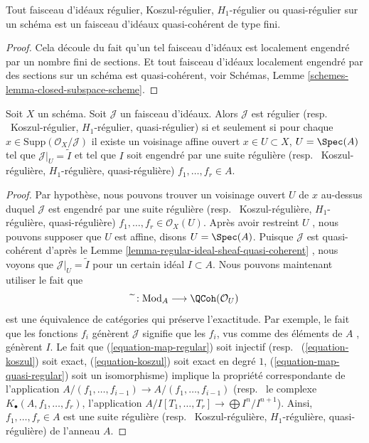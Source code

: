 \begin{lemma}
\label{lemma-regular-ideal-sheaf-quasi-coherent}
Tout faisceau d'idéaux régulier, Koszul-régulier,  $H_1$-régulier ou
quasi-régulier sur un schéma est un faisceau d'idéaux quasi-cohérent de type fini.
\end{lemma}

\begin{proof}
Cela découle du fait qu'un tel faisceau d'idéaux est localement engendré par un
nombre fini de sections. Et tout faisceau d'idéaux localement engendré par des
sections sur un schéma est quasi-cohérent, voir Schémas, Lemme  \ref{schemes-lemma-closed-subspace-scheme}.
\end{proof}

\begin{lemma}
\label{lemma-regular-ideal-sheaf-scheme}
Soit  $X$  un schéma. Soit  $\mathcal{J}$  un faisceau d'idéaux. Alors
 $\mathcal{J}$  est régulier (resp. \ Koszul-régulier,
 $H_1$-régulier, quasi-régulier) si et seulement si pour chaque  $x \in \text{Supp}(\mathcal{O}_X/\mathcal{J})$ 
il existe un voisinage affine ouvert  $x \in U \subset X$,  $U = \Spec(A)$  tel que
 $\mathcal{J}|_U = \widetilde{I}$  et tel que  $I$  soit engendré par une suite régulière (resp.
\ Koszul-régulière,  $H_1$-régulière, quasi-régulière)
 $f_1, \ldots, f_r \in A$.
\end{lemma}

\begin{proof}
Par hypothèse, nous pouvons trouver un voisinage ouvert  $U$  de
 $x$  au-dessus duquel  $\mathcal{J}$  est engendré par une suite régulière
(resp. \ Koszul-régulière,  $H_1$-régulière, quasi-régulière)
 $f_1, \ldots, f_r \in \mathcal{O}_X(U)$. Après avoir restreint  $U$ , nous pouvons supposer que
 $U$  est affine, disons  $U = \Spec(A)$. Puisque  $\mathcal{J}$  est
quasi-cohérent d'après le Lemme  \ref{lemma-regular-ideal-sheaf-quasi-coherent} , nous voyons que  $\mathcal{J}|_U = \widetilde{I}$  pour un
certain idéal  $I \subset A$. Nous pouvons maintenant utiliser le fait que
$$
\widetilde{\ } : \text{Mod}_A \longrightarrow \QCoh(\mathcal{O}_U)
$$
est une équivalence de catégories qui préserve l'exactitude. Par exemple, le fait
que les fonctions  $f_i$  génèrent  $\mathcal{J}$  signifie que les
 $f_i$, vus comme des éléments de  $A$ , génèrent  $I$. Le
fait que (\ref{equation-map-regular}) soit injectif (resp. \ (\ref{equation-koszul}) soit
exact, (\ref{equation-koszul}) soit exact en degré  $1$, (\ref{equation-map-quasi-regular}) soit un
isomorphisme) implique la propriété correspondante de l'application  $A/(f_1, \ldots, f_{i - 1}) \to A/(f_1, \ldots, f_{i - 1})$ 
(resp. \  le complexe  $K_\bullet(A, f_1, \ldots, f_r)$, l'application  $A/I[T_1, \ldots, T_r] \to \bigoplus I^n/I^{n + 1}$). Ainsi,
 $f_1, \ldots, f_r \in A$  est une suite régulière (resp. \ Koszul-régulière,
 $H_1$-régulière, quasi-régulière) de l’anneau  $A$.
\end{proof}

